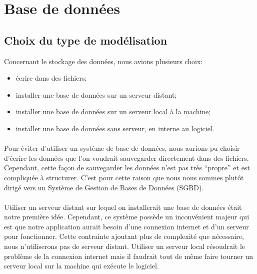 \section{Base de données}

\subsection{Choix du type de modélisation}

Concernant le stockage des données, nous avions plusieurs choix:

\begin{itemize}
	\item écrire dans des fichiers;
	\item installer une base de données sur un serveur distant;
	\item installer une base de données sur un serveur local à la machine;
	\item installer une base de données sans serveur, en interne au logiciel.
\end{itemize}

\paragraph{}

Pour éviter d’utiliser un système de base de données, nous aurions pu choisir d’écrire les données que l’on voudrait sauvegarder directement dans des fichiers. Cependant, cette façon de sauvegarder les données n’est pas très “propre” et est compliquée à structurer. C’est pour cette raison que nous nous sommes plutôt dirigé vers un Système de Gestion de Bases de Données (SGBD).

\paragraph{}

Utiliser un serveur distant sur lequel on installerait une base de données était notre première idée. Cependant, ce système possède un inconvénient majeur qui est que notre application aurait besoin d’une connexion internet et d’un serveur pour fonctionner. Cette contrainte ajoutant plus de complexité que nécessaire, nous n'utiliserons pas de serveur distant.
Utiliser un serveur local résoudrait le problème de la connexion internet mais il faudrait tout de même faire tourner un serveur local sur la machine qui exécute le logiciel.

\paragraph{}

